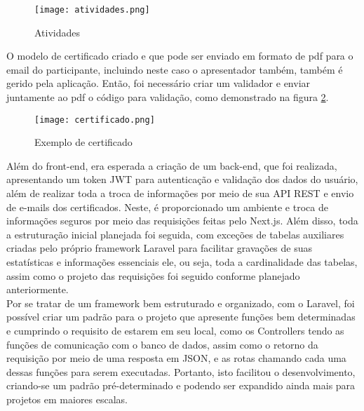 \begin{figure}[h]
    \caption{\label{atividades}Atividades}
    \vspace{5pt}
    \centering
    \texttt{[image: atividades.png]}
    \vspace{5pt}
\end{figure}
O modelo de certificado criado e que pode ser enviado em formato de pdf para o email do participante, incluindo neste caso o apresentador também, também é gerido pela aplicação. Então, foi necessário criar um validador e enviar juntamente ao pdf o código para validação, como demonstrado na figura \ref{certificado}.\\
\begin{figure}[h]
    \caption{\label{certificado}Exemplo de certificado}
    \vspace{5pt}
    \centering
    \texttt{[image: certificado.png]}
    \vspace{5pt}
\end{figure}
Além do front-end, era esperada a criação de um back-end, que foi realizada, apresentando um token JWT para autenticação e validação dos dados do usuário, além de realizar toda a troca de informações por meio de sua API REST e envio de e-mails dos certificados. Neste, é proporcionado um ambiente e troca de informações seguros por meio das requisições feitas pelo Next.js. Além disso, toda a estruturação inicial planejada foi seguida, com exceções de tabelas auxiliares criadas pelo próprio framework Laravel para facilitar gravações de suas estatísticas e informações essenciais ele, ou seja, toda a cardinalidade das tabelas, assim como o projeto das requisições foi seguido conforme planejado anteriormente.\\
Por se tratar de um framework bem estruturado e organizado, com o Laravel, foi possível criar um padrão para o projeto que apresente funções bem determinadas e cumprindo o requisito de estarem em seu local, como os Controllers tendo as funções de comunicação com o banco de dados, assim como o retorno da requisição por meio de uma resposta em JSON, e as rotas chamando cada uma dessas funções para serem executadas. Portanto, isto facilitou o desenvolvimento, criando-se um padrão pré-determinado e podendo ser expandido ainda mais para projetos em maiores escalas.\\
